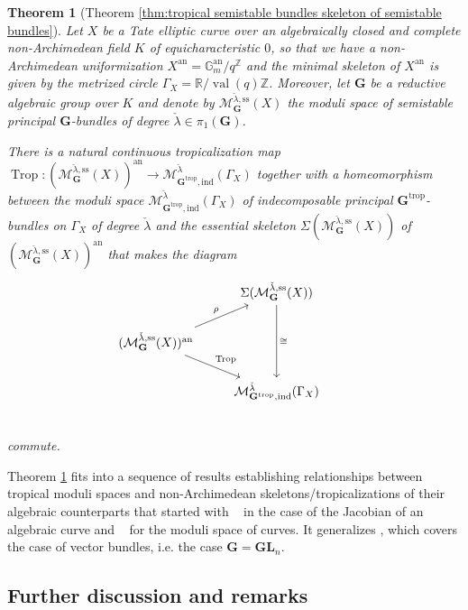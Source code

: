 \documentclass[10pt, a4paper]{amsart}
\newtheorem{maintheorem}{Theorem}[section]
\theoremstyle{definition}
\theoremstyle{myitemstyle}
\newcommand{\R}{\mathbb{R}}
\newcommand{\Z}{\mathbb{Z}}
\newcommand{\G}{\mathbb{G}}
\newcommand{\lambdacheck}{\check{\lambda}}
\newcommand{\bfG}{\mathbf{G}}
\newcommand{\bGL}{\mathbf{GL}}
\newcommand{\mc}[1]{{\mathcal{#1}}}
\DeclareMathOperator{\val}{val}
\DeclareMathOperator{\Trop}{Trop}
\newcommand{\an}{\mathrm{an}}
\newcommand{\semist}{\mathrm{ss}}
\newcommand{\ind}{\mathrm{ind}}
\newcommand{\trop}{{\mathrm{trop}}}
\newcommand{\Ga}{\Gamma}
\begin{document}
\begin{maintheorem}[Theorem \ref{thm:tropical semistable bundles skeleton of semistable bundles}]
\label{mainthm_skeleton=tropicalmodulispace}
    Let $X$ be a Tate elliptic curve over an algebraically closed and complete non-Archimedean field $K$ of equicharacteristic $0$, so that we have a non-Archimedean uniformization $X^{\an}=\G_m^{\an}/q^\Z$ and the minimal skeleton of $X^{\an}$ is given by the metrized circle $\Gamma_X=\R/\val(q)\Z$. Moreover, let $\mathbf{G}$ be a reductive algebraic group over $K$ and denote by $\mc M_{\mathbf{G}}^{\lambdacheck,\semist}(X)$ the moduli space of semistable principal $\mathbf{G}$-bundles of degree $\lambdacheck\in\pi_1(\mathbf{G})$.

    There is a natural continuous tropicalization map $\Trop: (\mc M_{\mathbf{G}}^{\lambdacheck,\semist}(X))^\an \rightarrow \mc M_{\bfG^\trop,\ind}^{\lambdacheck}(\Ga_X)$ together with a homeomorphism between the moduli space $\mc M_{\bfG^\trop,\ind}^{\lambdacheck}(\Ga_X)$ of indecomposable principal $\bfG^{\trop}$-bundles on $\Ga_X$ of degree $\lambdacheck$ and the essential skeleton $\Sigma(\mc M_{\mathbf{G}}^{\lambdacheck,\semist}(X))$ of $(\mc M_{\mathbf{G}}^{\lambdacheck,\semist}(X))^\an$ that makes the diagram
\begin{equation*}
    \begin{tikzcd}
    & 
        \Sigma(\mc M_{\mathbf{G}}^{\lambdacheck,\semist}(X))\arrow[dd,"\cong"] \\
    (\mc M_{\mathbf{G}}^{\lambdacheck,\semist}(X))^\an \arrow[ur,"\rho"]\arrow[dr,"\Trop"]&
        & \\
    &
        \mc M_{\bfG^\trop,\ind}^{\lambdacheck}(\Ga_X)\\
    \end{tikzcd}
\end{equation*}
    commute.
\end{maintheorem}

Theorem \ref{mainthm_skeleton=tropicalmodulispace} fits into a sequence of results establishing relationships between tropical moduli spaces and non-Archimedean skeletons/tropicalizations of their algebraic counterparts that started with ~\cite{BakerRabinoff} in the case of the Jacobian of an algebraic curve and ~\cite{ACP} for the moduli space of curves. It generalizes \cite[Theorem D]{2022GrossUlirschZakharov}, which covers the case of vector bundles, i.e. the case $\bfG=\bGL_n$.



\subsection*{Further discussion and remarks}
\end{document}
